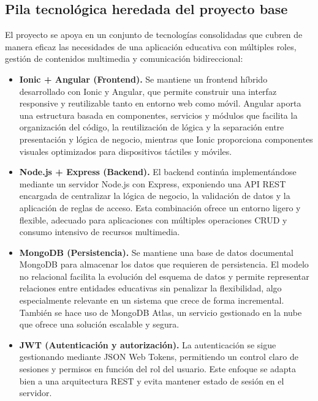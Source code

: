\subsection{Pila tecnológica heredada del proyecto base}

El proyecto se apoya en un conjunto de tecnologías consolidadas que cubren de manera eficaz las necesidades de una aplicación educativa con múltiples roles, gestión de contenidos multimedia y comunicación bidireccional:

\begin{itemize}
    \item \textbf{Ionic + Angular (Frontend).}  
    Se mantiene un frontend híbrido desarrollado con Ionic y Angular, que permite construir una interfaz responsive y reutilizable tanto en entorno web como móvil.  
    Angular aporta una estructura basada en componentes, servicios y módulos que facilita la organización del código, la reutilización de lógica y la separación entre presentación y lógica de negocio, mientras que Ionic proporciona componentes visuales optimizados para dispositivos táctiles y móviles.
\newpage
    \item \textbf{Node.js + Express (Backend).}  
    El backend continúa implementándose mediante un servidor Node.js con Express, exponiendo una API REST encargada de centralizar la lógica de negocio, la validación de datos y la aplicación de reglas de acceso.  
    Esta combinación ofrece un entorno ligero y flexible, adecuado para aplicaciones con múltiples operaciones CRUD y consumo intensivo de recursos multimedia.

    \item \textbf{MongoDB (Persistencia).}  
    Se mantiene una base de datos documental MongoDB para almacenar los datos que requieren de persistencia.  
    El modelo no relacional facilita la evolución del esquema de datos y permite representar relaciones entre entidades educativas sin penalizar la flexibilidad, algo especialmente relevante en un sistema que crece de forma incremental. También se hace uso de MongoDB Atlas, un servicio gestionado en la nube que ofrece una solución escalable y segura.

    \item \textbf{JWT (Autenticación y autorización).}  
    La autenticación se sigue gestionando mediante JSON Web Tokens, permitiendo un control claro de sesiones y permisos en función del rol del usuario.  
    Este enfoque se adapta bien a una arquitectura REST y evita mantener estado de sesión en el servidor.


\end{itemize}
